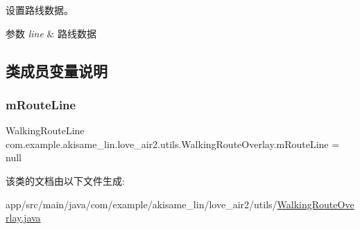 设置路线数据。


\begin{DoxyParams}{参数}
{\em line} & 路线数据 \\
\hline
\end{DoxyParams}


\subsection{类成员变量说明}
\mbox{\label{classcom_1_1example_1_1akisame__lin_1_1love__air2_1_1utils_1_1_walking_route_overlay_a9ea6b515de10a6ca638f015475f357b8}} 
\subsubsection{\texorpdfstring{mRouteLine}{mRouteLine}}
{\footnotesize\ttfamily Walking\+Route\+Line com.\+example.\+akisame\+\_\+lin.\+love\+\_\+air2.\+utils.\+Walking\+Route\+Overlay.\+m\+Route\+Line = null\hspace{0.3cm}{\ttfamily [private]}}



该类的文档由以下文件生成\+:\begin{DoxyCompactItemize}
\item 
app/src/main/java/com/example/akisame\+\_\+lin/love\+\_\+air2/utils/\mbox{\hyperlink{_walking_route_overlay_8java}{Walking\+Route\+Overlay.\+java}}\end{DoxyCompactItemize}
